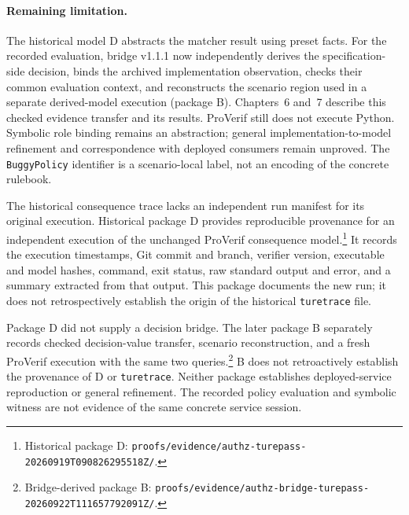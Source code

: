 \paragraph{Remaining limitation.}
The historical model D abstracts the matcher result using preset facts.
For the recorded evaluation, bridge v1.1.1 now independently derives the
specification-side decision, binds the archived implementation observation,
checks their common evaluation context, and reconstructs the scenario region
used in a separate derived-model execution (package B). Chapters~6 and~7
describe this checked evidence transfer and its results. ProVerif still does
not execute Python. Symbolic role binding remains an abstraction; general
implementation-to-model refinement and correspondence with deployed consumers
remain unproved. The \texttt{BuggyPolicy} identifier is a scenario-local label,
not an encoding of the concrete rulebook.

The historical consequence trace lacks an independent run manifest for its
original execution. Historical package D provides
reproducible provenance for an independent execution of the unchanged ProVerif
consequence model.\footnote{\raggedright Historical package D:
\texttt{proofs/\allowbreak evidence/\allowbreak authz-turepass-\allowbreak
20260919T090826295518Z/}.}
It records the execution timestamps, Git commit and branch, verifier version,
executable and model hashes, command, exit status, raw standard output and
error, and a summary extracted from that output. This package documents the
new run; it does not retrospectively establish the origin of the historical
\texttt{turetrace} file.

Package D did not supply a decision bridge. The later package B separately
records checked decision-value transfer, scenario reconstruction, and a fresh
ProVerif execution with the same two queries.\footnote{\raggedright Bridge-derived package B:
\texttt{proofs/\allowbreak evidence/\allowbreak authz-bridge-turepass-\allowbreak
20260922T111657792091Z/}.}
B does not retroactively establish the provenance of D or \texttt{turetrace}.
Neither package establishes deployed-service reproduction or general
refinement. The recorded policy evaluation and symbolic witness are not
evidence of the same concrete service session.

